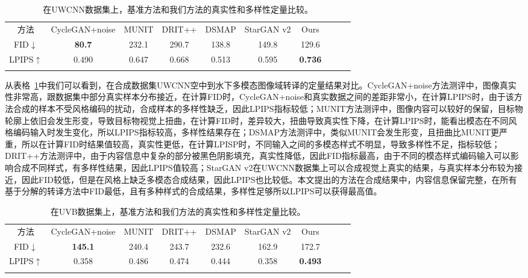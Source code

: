 \begin{table}[ht]
\centering
\caption{在UWCNN数据集上，基准方法和我们方法的真实性和多样性定量比较。}
  \begin{tabular}{c|ccccccccc}
    \hline\noalign{\smallskip}
    方法 & CycleGAN+noise & MUNIT & DRIT++ & DSMAP & StarGAN v2 & Ours \\
    \noalign{\smallskip}\hline\noalign{\smallskip}
    FID$\downarrow$ & \textbf{80.7} & 232.1 & 290.7 & 138.8 & 149.8 & 129.6          \\
    LPIPS$\uparrow$ & 0.490         & 0.647 & 0.668 & 0.513 & 0.595 & \textbf{0.736} \\
    \noalign{\smallskip}\hline
  \end{tabular}
  \label{tab:uwcnn_comparison}
\end{table}

从表格~\ref{tab:uwcnn_comparison}中我们可以看到，在合成数据集UWCNN空中到水下多模态图像域转译的定量结果对比。CycleGAN+noise方法测评中，图像真实性非常高，跟数据集中部分真实样本分布接近，在计算FID时，CycleGAN+noise和真实数据之间的差距非常小，在计算LPIPS时，由于该方法合成的样本不受风格编码的扰动，合成样本的多样性缺乏，因此LPIPS指标较低；MUNIT方法测评中，图像内容可以较好的保留，目标物轮廓上依旧会发生形变，导致目标物视觉上扭曲，在计算FID时，差异较大，扭曲导致真实性下降，在计算LPIPS时，能看出模态在不同风格编码输入时发生变化，所以LPIPS指标较高，多样性结果存在；DSMAP方法测评中，类似MUNIT会发生形变，且扭曲比MUNIT更严重，所以在计算FID时结果值较高，真实性更低，在计算LPISP时，不同输入之间的多模态样式不明显，导致多样性不足，指标较低；DRIT++方法测评中，由于内容信息中复杂的部分被黑色阴影填充，真实性降低，因此FID指标最高，由于不同的模态样式编码输入可以影响合成不同样式，有多样性结果，因此LPIPS值较高；StarGAN v2在UWCNN数据集上可以合成视觉上真实的结果，与真实样本分布较为接近，因此FID较低，但是在风格上缺乏多模态合成结果，因此LPIPS也比较低。本文提出的方法在合成结果中，内容信息保留完整，在所有基于分解的转译方法中FID最低，且有多种样式的合成结果，多样性足够所以LPIPS可以获得最高值。

\begin{table}[ht]
\centering
\caption{在UVB数据集上，基准方法和我们方法的真实性和多样性定量比较。}
  \begin{tabular}{c|ccccccccc}
    \hline\noalign{\smallskip}
    方法 & CycleGAN+noise & MUNIT & DRIT++ & DSMAP & StarGAN v2 & Ours \\
    \noalign{\smallskip}\hline\noalign{\smallskip}
    FID$\downarrow$ & \textbf{145.1} & 240.4 & 243.7 & 232.6 & 162.9 & 172.7          \\
    LPIPS$\uparrow$ & 0.358          & 0.486 & 0.474 & 0.444 & 0.358 & \textbf{0.493} \\
    \noalign{\smallskip}\hline
  \end{tabular}
  \label{tab:uvb_comparison}
\end{table}

